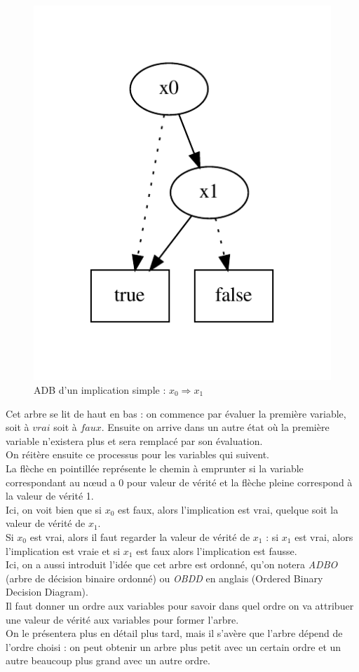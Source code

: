 \documentclass[a4paper, oneside]{report}
\begin{document}
\begin{figure}[htbp]
  \centering
  \includegraphics[trim = 0cm 1.5cm 0cm 1cm , scale=0.6]{exemple/impl_simple}
  \caption{ADB d'un implication simple : $x_0 \Rightarrow x_1$}
\end{figure}
Cet arbre se lit de haut en bas : on commence par évaluer la première variable, soit à $vrai$ soit à $faux$. Ensuite on arrive dans un autre état où la première variable n'existera plus et sera remplacé par son évaluation.\\
On réitère ensuite ce processus pour les variables qui suivent.\\
La flèche en pointillée représente le chemin à emprunter si la variable correspondant au nœud a 0 pour valeur de vérité et la flèche pleine correspond à la valeur de vérité 1.\\
Ici, on voit bien que si $x_0$ est faux, alors l'implication est vrai, quelque soit la valeur de vérité de $x_1$.\\
Si $x_0$ est vrai, alors il faut regarder la valeur de vérité de $x_1$ : si $x_1$ est vrai, alors l'implication est vraie et si $x_1$ est faux alors l'implication est fausse.\\

Ici, on a aussi introduit l'idée que cet arbre est ordonné, qu'on notera \textit{ADBO} (arbre de décision binaire ordonné) ou \textit{OBDD} en anglais (Ordered Binary Decision Diagram).\\
Il faut donner un ordre aux variables pour savoir dans quel ordre on va attribuer une valeur de vérité aux variables pour former l'arbre.\\
On le présentera plus en détail plus tard, mais il s'avère que l'arbre dépend de l'ordre choisi : on peut obtenir un arbre plus petit avec un certain ordre et un autre beaucoup plus grand avec un autre ordre.\\
\end{document}
